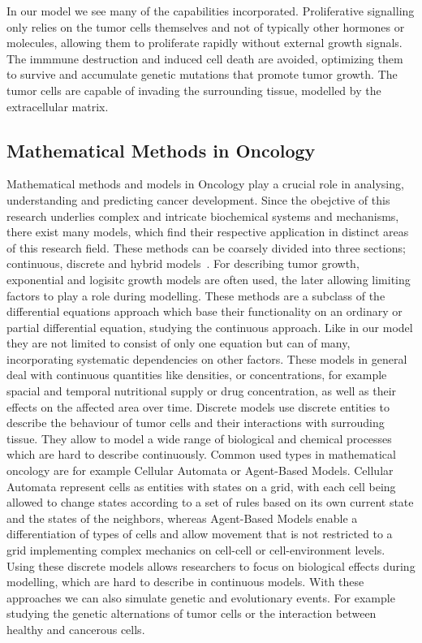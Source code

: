 In our model we see many of the capabilities incorporated. Proliferative signalling only relies on the tumor cells themselves and not of typically other hormones or molecules, allowing them to proliferate rapidly without external growth signals. The immmune destruction and induced cell death are avoided, optimizing them to survive and accumulate genetic mutations that promote tumor growth. The tumor cells are capable of invading the surrounding tissue, modelled by the extracellular matrix.

\subsection{Mathematical Methods in Oncology}
Mathematical methods and models in Oncology play a crucial role in analysing, understanding and predicting cancer development. Since the obejctive of this research underlies complex and intricate biochemical systems and mechanisms, there exist many models, which find their respective application in distinct areas of this research field. These methods can be coarsely divided into three sections; continuous, discrete and hybrid models~\cite{BEKISZ2020101198}. For describing tumor growth, exponential and logisitc growth models are often used, the later allowing limiting factors to play a role during modelling. These methods are a subclass of the differential equations approach which base their functionality on an ordinary or partial differential equation, studying the continuous approach. Like in our model they are not limited to consist of only one equation but can of many, incorporating systematic dependencies on other factors. These models in general deal with continuous quantities like densities, or concentrations, for example spacial and temporal nutritional supply or drug concentration, as well as their effects on the affected area over time. Discrete models use discrete entities to describe the behaviour of tumor cells and their interactions with surrouding tissue. They allow to model a wide range of biological and chemical processes which are hard to describe continuously. Common used types in mathematical oncology are for example Cellular Automata or Agent-Based Models. Cellular Automata represent cells as entities with states on a grid, with each cell being allowed to change states according to a set of rules based on its own current state and the states of the neighbors, whereas Agent-Based Models enable a differentiation of types of cells and allow movement that is not restricted to a grid implementing complex mechanics on cell-cell or cell-environment levels. Using these discrete models allows researchers to focus on biological effects during modelling, which are hard to describe in continuous models. With these approaches we can also simulate genetic and evolutionary events. For example studying the genetic alternations of tumor cells or the interaction between healthy and cancerous cells.\newline 
